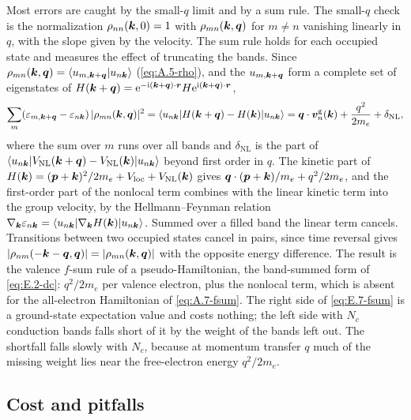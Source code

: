 Most errors are caught by the small-$q$ limit and by a sum rule. The small-$q$ check is the normalization $\rho_{nn}(\bm{k},0) = 1$ with $\rho_{mn}(\bm{k},\bm{q})$ for $m \neq n$ vanishing linearly in $q$, with the slope given by the velocity. The sum rule holds for each occupied state and measures the effect of truncating the bands. Since $\rho_{mn}(\bm{k},\bm{q}) = \langle u_{m,\bm{k}+\bm{q}}|u_{n\bm{k}}\rangle$ (\cref{eq:A.5-rho}), and the $u_{m,\bm{k}+\bm{q}}$ form a complete set of eigenstates of $H(\bm{k}+\bm{q}) = \mathrm{e}^{-\mathrm{i}(\bm{k}+\bm{q})\cdot\bm{r}}H\mathrm{e}^{\mathrm{i}(\bm{k}+\bm{q})\cdot\bm{r}}$,
\begin{equation}
  \sum_m(\varepsilon_{m,\bm{k}+\bm{q}} - \varepsilon_{n\bm{k}})\,|\rho_{mn}(\bm{k},\bm{q})|^2 = \langle u_{n\bm{k}}|H(\bm{k}+\bm{q}) - H(\bm{k})|u_{n\bm{k}}\rangle
  = \bm{q}\cdot\bm{v}^{\mathrm{g}}_n(\bm{k}) + \frac{q^2}{2m_e} + \delta_{\mathrm{NL}} ,
  \label{eq:E.7-fsum}
\end{equation}
where the sum over $m$ runs over all bands and $\delta_{\mathrm{NL}}$ is the part of $\langle u_{n\bm{k}}|V_{\mathrm{NL}}(\bm{k}+\bm{q}) - V_{\mathrm{NL}}(\bm{k})|u_{n\bm{k}}\rangle$ beyond first order in $q$. The kinetic part of $H(\bm{k}) = (\bm{p}+\bm{k})^2/2m_e + V_{\mathrm{loc}} + V_{\mathrm{NL}}(\bm{k})$ gives $\bm{q}\cdot(\bm{p}+\bm{k})/m_e + q^2/2m_e$, and the first-order part of the nonlocal term combines with the linear kinetic term into the group velocity, by the Hellmann--Feynman relation $\nabla_{\bm{k}}\varepsilon_{n\bm{k}} = \langle u_{n\bm{k}}|\nabla_{\bm{k}}H(\bm{k})|u_{n\bm{k}}\rangle$. Summed over a filled band the linear term cancels. Transitions between two occupied states cancel in pairs, since time reversal gives $|\rho_{nm}(-\bm{k}-\bm{q},\bm{q})| = |\rho_{mn}(\bm{k},\bm{q})|$ with the opposite energy difference. The result is the valence $f$-sum rule of a pseudo-Hamiltonian, the band-summed form of \cref{eq:E.2-dc}: $q^2/2m_e$ per valence electron, plus the nonlocal term, which is absent for the all-electron Hamiltonian of \cref{eq:A.7-fsum}. The right side of \cref{eq:E.7-fsum} is a ground-state expectation value and costs nothing; the left side with $N_c$ conduction bands falls short of it by the weight of the bands left out. The shortfall falls slowly with $N_c$, because at momentum transfer $q$ much of the missing weight lies near the free-electron energy $q^2/2m_e$.

\subsection{Cost and pitfalls}

